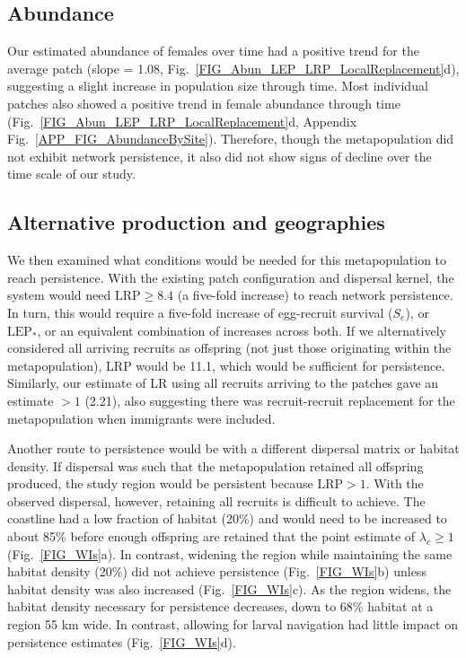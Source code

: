 \documentclass[12pt, oneside]{article}   	%
\begin{document}
\subsection*{Abundance}

Our estimated abundance of females over time had a positive trend for the average patch (slope = 1.08, Fig.\ \ref{FIG_Abun_LEP_LRP_LocalReplacement}d), suggesting a slight increase in population size through time. Most individual patches also showed a positive trend in female abundance through time (Fig.\ \ref{FIG_Abun_LEP_LRP_LocalReplacement}d, Appendix Fig.\ \ref{APP_FIG_AbundanceBySite}). Therefore, though the metapopulation did not exhibit network persistence, it also did not show signs of decline over the time scale of our study. 

\subsection*{Alternative production and geographies}

We then examined what conditions would be needed for this metapopulation to reach persistence. With the existing patch configuration and dispersal kernel, the system would need $\text{LRP} \geq 8.4$ (a five-fold increase) to reach network persistence. In turn, this would require a five-fold increase of egg-recruit survival ($S_e$), or $\text{LEP}_*$, or an equivalent combination of increases across both. If we alternatively considered all arriving recruits as offspring (not just those originating within the metapopulation), LRP would be 11.1, which would be sufficient for persistence. Similarly, our estimate of LR using all recruits arriving to the patches gave an estimate $> 1$ (2.21), also suggesting there was recruit-recruit replacement for the metapopulation when immigrants were included. 

Another route to persistence would be with a different dispersal matrix or habitat density. If dispersal was such that the metapopulation retained all offspring produced, the study region would be persistent because $\text{LRP} > 1$. With the observed dispersal, however, retaining all recruits is difficult to achieve. The coastline had a low fraction of habitat (20\%) and would need to be increased to about 85\% before enough offspring are retained that the point estimate of $\lambda_c \geq 1$ (Fig.\ \ref{FIG_WIs}a). In contrast, widening the region while maintaining the same habitat density (20\%) did not achieve persistence (Fig.\ \ref{FIG_WIs}b) unless habitat density was also increased (Fig.\ \ref{FIG_WIs}c). As the region widens, the habitat density necessary for persistence decreases, down to 68\% habitat at a region 55 km wide. In contrast, allowing for larval navigation had little impact on persistence estimates (Fig.\ \ref{FIG_WIs}d).
\end{document}
